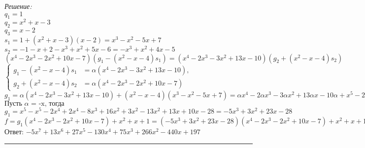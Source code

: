 \documentclass[a4paper, 12pt]{article}
\newenvironment{solution}
    {\textit{Решение: }}
    {\noindent\rule{7in}{1.5pt}}
\begin{document}
\begin{solution}
\\
$\displaystyle q_1 = 1$
\\
$\displaystyle q_2 = x^2 + x - 3$
\\
$\displaystyle q_3 = x - 2$
\\
$\displaystyle s_1 = 1 + (x^2+x-3)(x-2) = x^3-x^2-5x+7$
\\
$\displaystyle s_2 = -1 - x + 2 - x^3 + x^2 + 5x - 6 = -x^3 + x^2 + 4x - 5$
\\
$\displaystyle (x^4-2x^3-2x^2+10x-7)(g_1-(x^2-x-4)s_1) = (x^4-2x^3-3x^2+13x-10)(g_2+(x^2-x-4)s_2)$
\\
$\left\{
\begin{aligned}
    g_1-(x^2-x-4)s_1 &= \alpha(x^4-2x^3-3x^2+13x-10),\\
    g_2+(x^2-x-4)s_2 &= \alpha(x^4-2x^3-2x^2+10x-7)
\end{aligned}
\right.$
\\
$\displaystyle g_1 = \alpha(x^4-2x^3-3x^2+13x-10) + (x^2-x-4)(x^3-x^2-5x+7) = \alpha x^4 - 2\alpha x^3 - 3\alpha x^2 + 13\alpha x - 10\alpha + x^5 - 2x^4 - 8x^3 + 16x^2 + 13x - 28 = x^5 + (\alpha - 2)x^4 - (2\alpha + 8)x^3 + (16 - 3\alpha)x^2 + (13\alpha + 13)x - (10\alpha + 28)$
\\
$\displaystyle\text{Пусть $\alpha$ = -x, тогда}$
\\
$\displaystyle g_1 = x^5 - x^5 - 2x^4 + 2x^4 - 8x^3 + 16x^2 + 3x^2 - 13x^2 + 13x + 10x - 28 = -5x^3 + 3x^2 + 23x - 28$
\\
$\displaystyle f = g_1(x^4-2x^3-2x^2+10x-7) + x^2 + x + 1 = (-5x^3 + 3x^2 + 23x - 28)(x^4-2x^3-2x^2+10x-7) + x^2 + x + 1 = -5x^7 + 13x^6 + 27x^5 - 130x^4 + 75x^3 + 266x^2 - 440x + 197$
\\
Ответ: $\displaystyle -5x^7 + 13x^6 + 27x^5 - 130x^4 + 75x^3 + 266x^2 - 440x + 197$

\end{solution}


\end{document}
